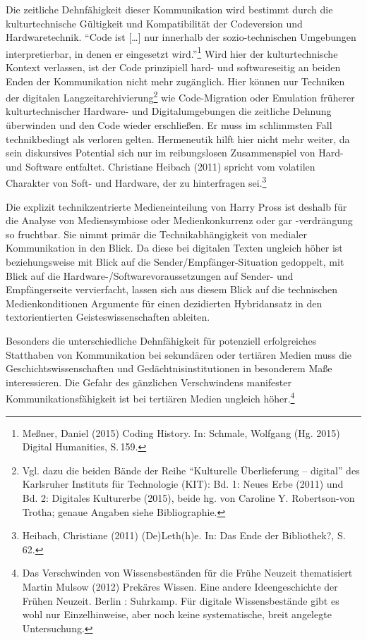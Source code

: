 \documentclass[a4paper,
fontsize=11pt,
oneside,
numbers=noperiodatend,
parskip=half-,
bibliography=totoc,
final
]{scrartcl}
\begin{document}
Die zeitliche Dehnfähigkeit dieser Kommunikation wird bestimmt durch die
kulturtechnische Gültigkeit und Kompatibilität der Codeversion und
Hardwaretechnik. \enquote{Code ist {[}\ldots{}{]} nur innerhalb der
sozio-technischen Umgebungen interpretierbar, in denen er eingesetzt
wird.}\footnote{Meßner, Daniel (2015) Coding History. In: Schmale,
  Wolfgang (Hg. 2015) Digital Humanities, S.\,159.} Wird hier der
kulturtechnische Kontext verlassen, ist der Code prinzipiell hard- und
softwareseitig an beiden Enden der Kommunikation nicht mehr zugänglich.
Hier können nur Techniken der digitalen Langzeitarchivierung\footnote{Vgl.
  dazu die beiden Bände der Reihe \enquote{Kulturelle Überlieferung --
  digital} des Karlsruher Instituts für Technologie (KIT): Bd. 1: Neues
  Erbe (2011) und Bd. 2: Digitales Kulturerbe (2015), beide hg. von
  Caroline Y. Robertson-von Trotha; genaue Angaben siehe Bibliographie.}
wie Code-Migration oder Emulation früherer kulturtechnischer Hardware-
und Digitalumgebungen die zeitliche Dehnung überwinden und den Code
wieder erschließen. Er muss im schlimmsten Fall technikbedingt als
verloren gelten. Hermeneutik hilft hier nicht mehr weiter, da sein
diskursives Potential sich nur im reibungslosen Zusammenspiel von Hard-
und Software entfaltet. Christiane Heibach (2011) spricht vom volatilen
Charakter von Soft- und Hardware, der zu hinterfragen sei.\footnote{Heibach,
  Christiane (2011) (De)Leth(h)e. In: Das Ende der Bibliothek?, S.\,62.}

Die explizit technikzentrierte Medieneinteilung von Harry Pross ist
deshalb für die Analyse von Mediensymbiose oder Medienkonkurrenz oder
gar -verdrängung so fruchtbar. Sie nimmt primär die Technikabhängigkeit
von medialer Kommunikation in den Blick. Da diese bei digitalen Texten
ungleich höher ist beziehungsweise mit Blick auf die
Sender/Empfänger-Situation gedoppelt, mit Blick auf die
Hardware-/Softwarevoraussetzungen auf Sender- und Empfängerseite
vervierfacht, lassen sich aus diesem Blick auf die technischen
Medienkonditionen Argumente für einen dezidierten Hybridansatz in den
textorientierten Geisteswissenschaften ableiten.

Besonders die unterschiedliche Dehnfähigkeit für potenziell
erfolgreiches Statthaben von Kommunikation bei sekundären oder tertiären
Medien muss die Geschichtswissenschaften und Gedächtnisinstitutionen in
besonderem Maße interessieren. Die Gefahr des gänzlichen Verschwindens
manifester Kommunikationsfähigkeit ist bei tertiären Medien ungleich
höher.\footnote{Das Verschwinden von Wissensbeständen für die Frühe
  Neuzeit thematisiert Martin Mulsow (2012) Prekäres Wissen. Eine andere
  Ideengeschichte der Frühen Neuzeit. Berlin : Suhrkamp. Für digitale
  Wissensbestände gibt es wohl nur Einzelhinweise, aber noch keine
  systematische, breit angelegte Untersuchung.}
\end{document}
